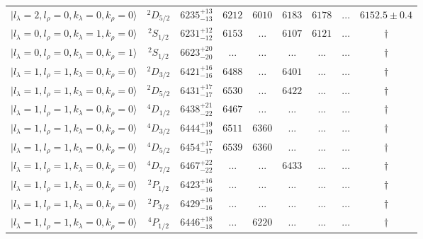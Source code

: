 \begin{tabular}{c c| c c c c c c c}
$\vert l_{\lambda}\!\!=\!2, l_{\rho}\!\!=\!0, k_{\lambda}\!\!=\!0, k_{\rho}\!\!=\!0 \rangle$ & $^{2}D_{5/2}$ & $6235^{+13}_{-13}$ & $6212$ & $6010$ & $6183$ & $6178$ & ... & $6152.5\pm 0.4$ \\ 
$\vert l_{\lambda}\!\!=\!0, l_{\rho}\!\!=\!0, k_{\lambda}\!\!=\!1, k_{\rho}\!\!=\!0 \rangle$ & $^{2}S_{1/2}$ & $6231^{+12}_{-12}$ & $6153$ & ... & $6107$ & $6121$ & ... & $\dagger$ \\ 
$\vert l_{\lambda}\!\!=\!0, l_{\rho}\!\!=\!0, k_{\lambda}\!\!=\!0, k_{\rho}\!\!=\!1 \rangle$ & $^{2}S_{1/2}$ & $6623^{+20}_{-20}$ & ... & ... & ... & ... & ... & $\dagger$ \\ 
$\vert l_{\lambda}\!\!=\!1, l_{\rho}\!\!=\!1, k_{\lambda}\!\!=\!0, k_{\rho}\!\!=\!0 \rangle$ & $^{2}D_{3/2}$ & $6421^{+16}_{-16}$ & $6488$ & ... & $6401$ & ... & ... & $\dagger$ \\ 
$\vert l_{\lambda}\!\!=\!1, l_{\rho}\!\!=\!1, k_{\lambda}\!\!=\!0, k_{\rho}\!\!=\!0 \rangle$ & $^{2}D_{5/2}$ & $6431^{+17}_{-17}$ & $6530$ & ... & $6422$ & ... & ... & $\dagger$ \\ 
$\vert l_{\lambda}\!\!=\!1, l_{\rho}\!\!=\!1, k_{\lambda}\!\!=\!0, k_{\rho}\!\!=\!0 \rangle$ & $^{4}D_{1/2}$ & $6438^{+21}_{-22}$ & $6467$ & ... & ... & ... & ... & $\dagger$ \\ 
$\vert l_{\lambda}\!\!=\!1, l_{\rho}\!\!=\!1, k_{\lambda}\!\!=\!0, k_{\rho}\!\!=\!0 \rangle$ & $^{4}D_{3/2}$ & $6444^{+19}_{-19}$ & $6511$ & $6360$ & ... & ... & ... & $\dagger$ \\ 
$\vert l_{\lambda}\!\!=\!1, l_{\rho}\!\!=\!1, k_{\lambda}\!\!=\!0, k_{\rho}\!\!=\!0 \rangle$ & $^{4}D_{5/2}$ & $6454^{+17}_{-17}$ & $6539$ & $6360$ & ... & ... & ... & $\dagger$ \\ 
$\vert l_{\lambda}\!\!=\!1, l_{\rho}\!\!=\!1, k_{\lambda}\!\!=\!0, k_{\rho}\!\!=\!0 \rangle$ & $^{4}D_{7/2}$ & $6467^{+22}_{-22}$ & ... & ... & $6433$ & ... & ... & $\dagger$ \\ 
$\vert l_{\lambda}\!\!=\!1, l_{\rho}\!\!=\!1, k_{\lambda}\!\!=\!0, k_{\rho}\!\!=\!0 \rangle$ & $^{2}P_{1/2}$ & $6423^{+16}_{-16}$ & ... & ... & ... & ... & ... & $\dagger$ \\ 
$\vert l_{\lambda}\!\!=\!1, l_{\rho}\!\!=\!1, k_{\lambda}\!\!=\!0, k_{\rho}\!\!=\!0 \rangle$ & $^{2}P_{3/2}$ & $6429^{+16}_{-16}$ & ... & ... & ... & ... & ... & $\dagger$ \\ 
$\vert l_{\lambda}\!\!=\!1, l_{\rho}\!\!=\!1, k_{\lambda}\!\!=\!0, k_{\rho}\!\!=\!0 \rangle$ & $^{4}P_{1/2}$ & $6446^{+18}_{-18}$ & ... & $6220$ & ... & ... & ... & $\dagger$ \\ 

\end{tabular}
